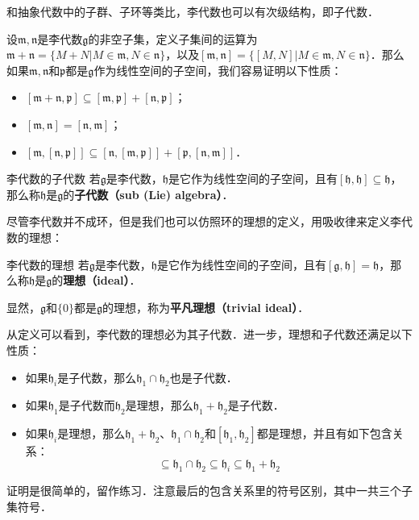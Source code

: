 



和抽象代数中的子群、子环等类比，李代数也可以有次级结构，即子代数．

设$\mathfrak{m}, \mathfrak{n}$是李代数$\mathfrak{g}$的非空子集，定义子集间的运算为$\mathfrak{m}+\mathfrak{n}=\{M+N|M\in\mathfrak{m}, N\in\mathfrak{n}\}$，以及$[\mathfrak{m}, \mathfrak{n}]=\{[M, N]|M\in\mathfrak{m}, N\in\mathfrak{n}\}$．那么如果$\mathfrak{m}, \mathfrak{n}$和$\mathfrak{p}$都是$\mathfrak{g}$作为线性空间的子空间，我们容易证明以下性质：

\begin{itemize}
\item $[\mathfrak{m}+\mathfrak{n}, \mathfrak{p}]\subseteq[\mathfrak{m}, \mathfrak{p}]+[\mathfrak{n}, \mathfrak{p}]$；
\item $[\mathfrak{m},\mathfrak{n}]=[\mathfrak{n}, \mathfrak{m}]$；
\item $[\mathfrak{m}, [\mathfrak{n}, \mathfrak{p}]]\subseteq[\mathfrak{n}, [\mathfrak{m}, \mathfrak{p}]]+[\mathfrak{p}, [\mathfrak{n}, \mathfrak{m}]]$．
\end{itemize}

\begin{definition}{李代数的子代数}
若$\mathfrak{g}$是李代数，$\mathfrak{h}$是它作为线性空间的子空间，且有$[\mathfrak{h}, \mathfrak{h}]\subseteq\mathfrak{h}$，那么称$\mathfrak{h}$是$\mathfrak{g}$的\textbf{子代数（sub (Lie) algebra）}．
\end{definition}


尽管李代数并不成环，但是我们也可以仿照环的理想的定义，用吸收律来定义李代数的理想：

\begin{definition}{李代数的理想}
若$\mathfrak{g}$是李代数，$\mathfrak{h}$是它作为线性空间的子空间，且有$[\mathfrak{g}, \mathfrak{h}]=\mathfrak{h}$，那么称$\mathfrak{h}$是$\mathfrak{g}$的\textbf{理想（ideal）}．

显然，$\mathfrak{g}$和$\{0\}$都是$\mathfrak{g}$的理想，称为\textbf{平凡理想（trivial ideal）}．
\end{definition}

从定义可以看到，李代数的理想必为其子代数．进一步，理想和子代数还满足以下性质：

\begin{itemize}
\item 如果$\mathfrak{h}_i$是子代数，那么$\mathfrak{h}_1\cap\mathfrak{h}_2$也是子代数．
\item 如果$\mathfrak{h}_1$是子代数而$\mathfrak{h}_2$是理想，那么$\mathfrak{h}_1+\mathfrak{h}_2$是子代数．
\item 如果$\mathfrak{h}_i$是理想，那么$\mathfrak{h}_1+\mathfrak{h}_2$、$\mathfrak{h}_1\cap\mathfrak{h}_2$和$[\mathfrak{h}_1, \mathfrak{h}_2]$都是理想，并且有如下包含关系：\begin{equation}
[\mathfrak{h}_1, \mathfrak{h}_2]\subseteq\mathfrak{h}_1\cap\mathfrak{h}_2\subseteq\mathfrak{h}_i\subseteq\mathfrak{h}_1+\mathfrak{h}_2
\end{equation}

\end{itemize}

证明是很简单的，留作练习．注意最后的包含关系里的符号区别，其中一共三个子集符号．








